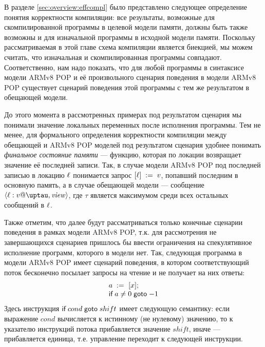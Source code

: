 В разделе \ref{sec:overview:effcompl} было представлено следующее определение понятия корректности компиляции:
все результаты, возможные для скомпилированной программы в целевой модели памяти,
должны быть также возможны и для изначальной программы в исходной модели памяти.
Поскольку рассматриваемая в этой главе схема компиляции является биекцией,
мы можем считать, что изначальная и скомпилированная программы совпадают.
Соответственно, нам надо показать, что для любой программы в синтаксисе модели
ARMv8 POP и её произвольного сценария поведения в модели ARMv8 POP существует
сценарий поведения этой программы с тем же результатом в обещающей модели.

До этого момента в рассмотренных примерах под результатом сценария мы понимали значение
локальных переменных после исполнения программы.
Тем не менее, для формального определения корректности компиляции между
обещающей и ARMv8 POP моделей под результатом сценария удобнее понимать 
\emph{финальное состояние памяти} --- функцию, которая по локации
возвращает значение её последней записи.
Так, в случае модели ARMv8 POP под последней записью в локацию $\ell$ понимается
запрос $[\ell]\;:=\;v$, попавший последним в основную память,
а в случае обещающей модели --- сообщение $\angled{\loc:\val@\tau,\R}$,
где $\tau$ является максимумом среди всех остальных сообщений в $\ell$.


Также отметим, что далее будут рассматриваться только конечные сценарии поведения
в рамках модели ARMv8 POP, т.к. для рассмотрения не завершающихся сценариев пришлось
бы ввести ограничения на спекулятивное исполнение программ, которого в модели нет.
Так, следующая программа в модели ARMv8 POP имеет сценарий поведения,
в котором соответствующий поток бесконечно посылает запросы на чтение и
не получает на них ответы:
\[\begin{array}{l}
a \;:=_{}\;[x]; \\
\textsf{if} \; a \not = 0 \; \textsf{goto} \; {-1}
\end{array}\]
Здесь инструкция $\textsf{if} \; cond \; \textsf{goto} \; shift$ имеет следующую семантику:
если выражение $cond$ вычисляется к истинному (не нулевому) значению,
то к указателю инструкций потока прибавляется значение $shift$,
иначе --- прибавляется единица, т.е. управление переходит к следующей инструкции.

